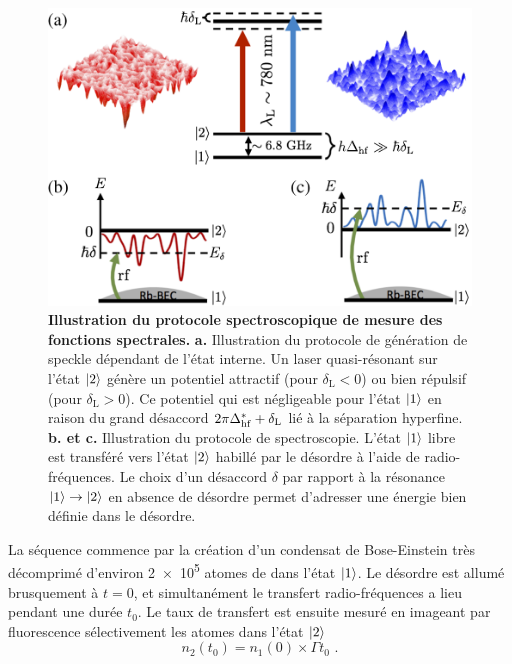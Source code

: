 \begin{figure}
\centering
\includegraphics[scale=1.2]{Fig/TauS_NJP/illustration_mesure_fonction_spectrale.pdf}
\caption{\textbf{Illustration du protocole spectroscopique de mesure des fonctions spectrales.} \textbf{a.} Illustration du protocole de génération de speckle dépendant de l'état interne. Un laser quasi-résonant sur l'état $\protect\left| 2 \right\rangle$ génère un potentiel attractif (pour $\delta_{\mathrm{L}}<0$) ou bien répulsif (pour $\delta_{\mathrm{L}}>0$). Ce potentiel qui est négligeable pour l'état $\protect\left| 1 \right\rangle$ en raison du grand désaccord $2\pi\Delta_{\mathrm{hf}}^*+\delta_{\mathrm{L}}$ lié à la séparation hyperfine. \textbf{b. et c.} Illustration du protocole de spectroscopie. L'état $\protect\left| 1 \right\rangle$ libre est transféré vers l'état $\protect\left| 2 \right\rangle$ habillé par le désordre à l'aide de radio-fréquences. Le choix d'un désaccord $\delta$ par rapport à la résonance $\protect\left| 1 \right\rangle\rightarrow \protect\left| 2 \right\rangle$ en absence de désordre permet d'adresser une énergie bien définie dans le désordre. }
\label{fig:illustration_fonction_spectrale}
\end{figure}

La séquence commence par la création d'un condensat de Bose-Einstein  très décomprimé d'environ \SI{2e5}{} atomes de  dans l'état $\left| 1 \right\rangle$. Le désordre est allumé brusquement à $t=0$, et simultanément  le transfert radio-fréquences a lieu pendant une durée $t_0$. Le taux de transfert est ensuite mesuré en imageant par fluorescence sélectivement les atomes dans l'état $\left| 2 \right\rangle$
\begin{equation}
n_2(t_0)=n_1(0) \times \Gamma t_0 \text{ .}
\end{equation}



